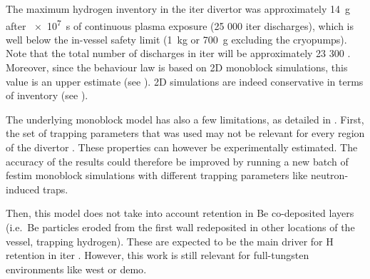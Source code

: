 The maximum hydrogen \gls{inventory} in the \gls{iter} \gls{divertor} was approximately \SI{14}{g} after \SI{e7}{s} of continuous plasma exposure (25 000 \gls{iter} discharges), which is well below the in-vessel safety limit (\SI{1}{kg} or \SI{700}{g} excluding the cryopumps).
Note that the total number of discharges in \gls{iter} will be approximately 23 300 \cite{pitts_physics_2019}.
Moreover, since the behaviour law is based on 2D \gls{monoblock} simulations, this value is an upper estimate (see ).
2D simulations are indeed conservative in terms of \gls{inventory} (see ).

The underlying \gls{monoblock} model has also a few limitations, as detailed in .
First, the set of trapping parameters that was used may not be relevant for every region of the \gls{divertor} .
These properties can however be experimentally estimated.
The accuracy of the results could therefore be improved by running a new batch of \gls{festim} \gls{monoblock} simulations with different trapping parameters like neutron-induced traps.

Then, this model does not take into account \gls{retention} in \gls{Be} co-deposited layers (i.e.\ \gls{Be} particles eroded from the \gls{first wall} redeposited in other locations of the vessel, trapping hydrogen).
These are expected to be the main driver for \gls{H} \gls{retention} in \gls{iter} .
However, this work is still relevant for full-tungsten environments like \gls{west} or \gls{demo}.
